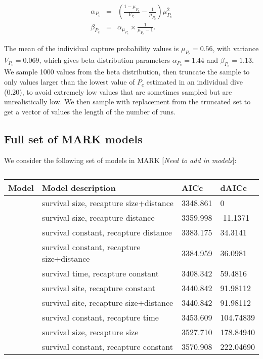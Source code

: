 \documentclass[12pt, oneside]{article}   	%
\begin{document}
\begin{eqnarray}
\alpha_{P_c} &=& (\frac{1-\mu_{P_c}}{V_{P_c}} - \frac{1}{\mu_{P_c}}) \mu_{P_c}^2 \\
\beta_{P_c} &=& \alpha_{\mu_{P_c}} \times \frac{1}{\mu_{P_c} - 1}. \label{APP_EQN_ProbCapBetaDistParams}  %
\end{eqnarray}


The mean of the individual capture probability values is $\mu_{P_c} = 0.56$, with variance $V_{P_c} = 0.069$, which gives beta distribution parameters $\alpha_{P_c} = 1.44$ and $\beta_{P_c} = 1.13$. We sample 1000 values from the beta distribution, then truncate the sample to only values larger than the lowest value of $P_c$ estimated in an individual dive (0.20), to avoid extremely low values that are sometimes sampled but are unrealistically low. We then sample with replacement from the truncated set to get a vector of values the length of the number of runs.

\newpage{}

\subsection{Full set of MARK models} \label{APP_MARKModels}
We consider the following set of models in MARK [\textit{Need to add in models}]:
\begin{table}
\begin{centering}
\begin{tabular}{|p{2in}|p{2.5in}|p{0.75in}|p{0.75in}|}
\hline 
\textbf{Model} & \textbf{Model description} & \textbf{AICc} & \textbf{dAICc} \\ \hline
& survival size, recapture size+distance & 3348.861 & 0 \\ \hline
& survival size, recapture distance & 3359.998 & -11.1371 \\ \hline
& survival constant, recapture distance & 3383.175 & 34.3141 \\ \hline
& survival constant, recapture size+distance & 3384.959 & 36.0981 \\ \hline
& survival time, recapture constant & 3408.342 & 59.4816 \\ \hline
& survival site, recapture constant & 3440.842 & 91.98112 \\ \hline
& survival site, recapture size+distance & 3440.842 & 91.98112 \\ \hline
& survival constant, recapture time & 3453.609 & 104.74839 \\ \hline
& survival size, recapture size & 3527.710 & 178.84940 \\ \hline
& survival constant, recapture constant & 3570.908 & 222.04690 \\ \hline
\end{tabular}
\end{centering}
\caption{}\label{APP_TAB_MARKmodels}
\end{table}
\end{document}
